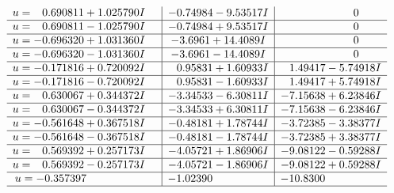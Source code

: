 \documentclass[1p]{elsarticle_modified}
\theoremstyle{definition}
\begin{document}
$$\begin{array}{c|c|c}
\begin{aligned}
u &= \phantom{-}0.690811 + 1.025790 I\end{aligned}
 & -0.74984 - 9.53517 I & \phantom{-0.000000 } 0 \\ \hline\begin{aligned}
u &= \phantom{-}0.690811 - 1.025790 I\end{aligned}
 & -0.74984 + 9.53517 I & \phantom{-0.000000 } 0 \\ \hline\begin{aligned}
u &= -0.696320 + 1.031360 I\end{aligned}
 & -3.6961 + 14.4089 I & \phantom{-0.000000 } 0 \\ \hline\begin{aligned}
u &= -0.696320 - 1.031360 I\end{aligned}
 & -3.6961 - 14.4089 I & \phantom{-0.000000 } 0 \\ \hline\begin{aligned}
u &= -0.171816 + 0.720092 I\end{aligned}
 & \phantom{-}0.95831 + 1.60933 I & \phantom{-}1.49417 - 5.74918 I \\ \hline\begin{aligned}
u &= -0.171816 - 0.720092 I\end{aligned}
 & \phantom{-}0.95831 - 1.60933 I & \phantom{-}1.49417 + 5.74918 I \\ \hline\begin{aligned}
u &= \phantom{-}0.630067 + 0.344372 I\end{aligned}
 & -3.34533 - 6.30811 I & -7.15638 + 6.23846 I \\ \hline\begin{aligned}
u &= \phantom{-}0.630067 - 0.344372 I\end{aligned}
 & -3.34533 + 6.30811 I & -7.15638 - 6.23846 I \\ \hline\begin{aligned}
u &= -0.561648 + 0.367518 I\end{aligned}
 & -0.48181 + 1.78744 I & -3.72385 - 3.38377 I \\ \hline\begin{aligned}
u &= -0.561648 - 0.367518 I\end{aligned}
 & -0.48181 - 1.78744 I & -3.72385 + 3.38377 I \\ \hline\begin{aligned}
u &= \phantom{-}0.569392 + 0.257173 I\end{aligned}
 & -4.05721 + 1.86906 I & -9.08122 - 0.59288 I \\ \hline\begin{aligned}
u &= \phantom{-}0.569392 - 0.257173 I\end{aligned}
 & -4.05721 - 1.86906 I & -9.08122 + 0.59288 I \\ \hline\begin{aligned}
u &= -0.357397\phantom{ +0.000000I}\end{aligned}
 & -1.02390\phantom{ +0.000000I} & -10.8300\phantom{ +0.000000I}\\
 \hline 
 \end{array}$$\newpage
\end{document}
